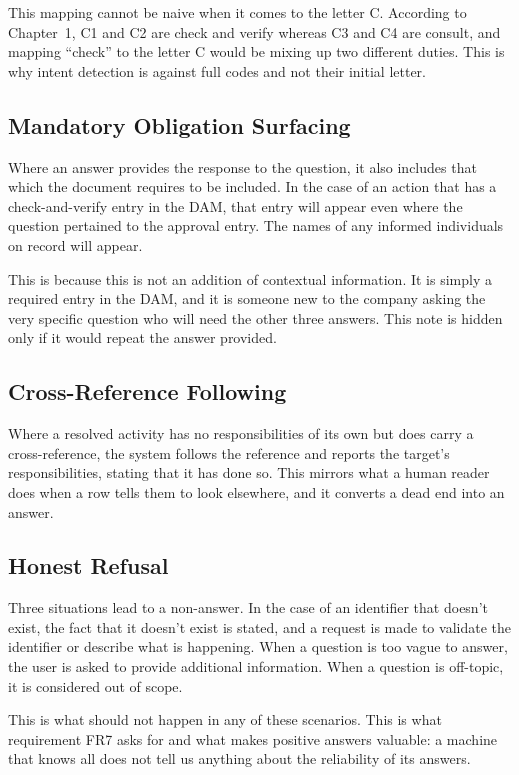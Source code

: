 This mapping cannot be naive when it comes to the letter C. According to Chapter~1, C1 and C2 are check and verify whereas C3 and C4 are consult, and mapping ``check'' to the letter C would be mixing up two different duties. This is why intent detection is against full codes and not their initial letter.

\subsection{Mandatory Obligation Surfacing}

Where an answer provides the response to the question, it also includes that which the document requires to be included. In the case of an action that has a check-and-verify entry in the DAM, that entry will appear even where the question pertained to the approval entry. The names of any informed individuals on record will appear.

This is because this is not an addition of contextual information. It is simply a required entry in the DAM, and it is someone new to the company asking the very specific question who will need the other three answers. This note is hidden only if it would repeat the answer provided.

\subsection{Cross-Reference Following}

Where a resolved activity has no responsibilities of its own but does carry a cross-reference, the system follows the reference and reports the target's responsibilities, stating that it has done so. This mirrors what a human reader does when a row tells them to look elsewhere, and it converts a dead end into an answer.

\subsection{Honest Refusal}

Three situations lead to a non-answer. In the case of an identifier that doesn't exist, the fact that it doesn't exist is stated, and a request is made to validate the identifier or describe what is happening. When a question is too vague to answer, the user is asked to provide additional information. When a question is off-topic, it is considered out of scope.

This is what should not happen in any of these scenarios. This is what requirement FR7 asks for and what makes positive answers valuable: a machine that knows all does not tell us anything about the reliability of its answers.

